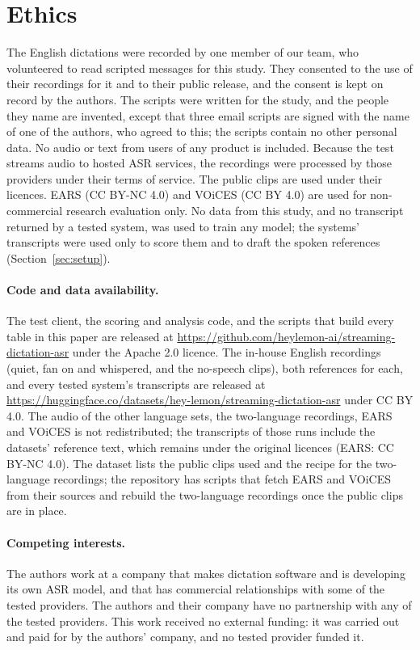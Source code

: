 \documentclass[11pt]{article}
\begin{document}
\FloatBarrier
\section*{Ethics}
The English dictations were recorded by one member of our team, who volunteered to read scripted messages for this study. They consented to the use of their recordings for it and to their public release, and the consent is kept on record by the authors. The scripts were written for the study, and the people they name are invented, except that three email scripts are signed with the name of one of the authors, who agreed to this; the scripts contain no other personal data. No audio or text from users of any product is included. Because the test streams audio to hosted ASR services, the recordings were processed by those providers under their terms of service. The public clips are used under their licences. EARS (CC BY-NC 4.0) and VOiCES (CC BY 4.0) are used for non-commercial research evaluation only. No data from this study, and no transcript returned by a tested system, was used to train any model; the systems' transcripts were used only to score them and to draft the spoken references (Section~\ref{sec:setup}).

\paragraph{Code and data availability.} The test client, the scoring and analysis code, and the scripts that build every table in this paper are released at \url{https://github.com/heylemon-ai/streaming-dictation-asr} under the Apache 2.0 licence. The in-house English recordings (quiet, fan on and whispered, and the no-speech clips), both references for each, and every tested system's transcripts are released at \url{https://huggingface.co/datasets/hey-lemon/streaming-dictation-asr} under CC BY 4.0. The audio of the other language sets, the two-language recordings, EARS and VOiCES is not redistributed; the transcripts of those runs include the datasets' reference text, which remains under the original licences (EARS: CC BY-NC 4.0). The dataset lists the public clips used and the recipe for the two-language recordings; the repository has scripts that fetch EARS and VOiCES from their sources and rebuild the two-language recordings once the public clips are in place.

\paragraph{Competing interests.} The authors work at a company that makes dictation software and is developing its own ASR model, and that has commercial relationships with some of the tested providers. The authors and their company have no partnership with any of the tested providers. This work received no external funding: it was carried out and paid for by the authors' company, and no tested provider funded it.
\end{document}
